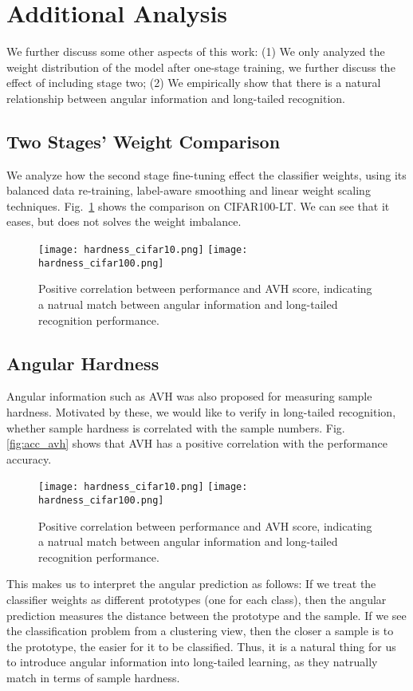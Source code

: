 \documentclass[10pt,twocolumn,letterpaper]{article}
\begin{document}
\section{Additional Analysis}
We further discuss some other aspects of this work: (1) We only analyzed the weight distribution of the model after one-stage training, we further discuss the effect of including stage two; (2) We empirically show that there is a natural relationship between angular information and long-tailed recognition.

\subsection{Two Stages' Weight Comparison}
We analyze how the second stage fine-tuning effect the classifier weights, using its balanced data re-training, label-aware smoothing and linear weight scaling techniques. Fig.~\ref{fig:two_stage_compare} shows the comparison on CIFAR100-LT. We can see that it eases, but does not solves the weight imbalance. 

\begin{figure}[h]
  \centering
  \texttt{[image: hardness\_cifar10.png]}
  \texttt{[image: hardness\_cifar100.png]}\vspace{-5pt}
   \caption{Positive correlation between performance and AVH score, indicating a natrual match between angular information and long-tailed recognition performance.}
   \label{fig:two_stage_compare}
   \vspace{-5pt}
\end{figure}

\subsection{Angular Hardness}
Angular information such as AVH was also proposed for measuring sample hardness. Motivated by these, we would like to verify in long-tailed recognition, whether sample hardness is correlated with the sample numbers. Fig. \ref{fig:acc_avh} shows that AVH has a positive correlation with the performance accuracy. 

\begin{figure}[h]
  \centering
  \texttt{[image: hardness\_cifar10.png]}
  \texttt{[image: hardness\_cifar100.png]}\vspace{-5pt}
   \caption{Positive correlation between performance and AVH score, indicating a natrual match between angular information and long-tailed recognition performance.}
   \label{fig:vit_weight}
   \vspace{-5pt}
\end{figure}

This makes us to interpret the angular prediction as follows: If we treat the classifier weights as different prototypes (one for each class), then the angular prediction measures the distance between the prototype and the sample. If we see the classification problem from a clustering view, then the closer a sample is to the prototype, the easier for it to be classified. Thus, it is a natural thing for us to introduce angular information into long-tailed learning, as they natrually match in terms of sample hardness.
\end{document}
